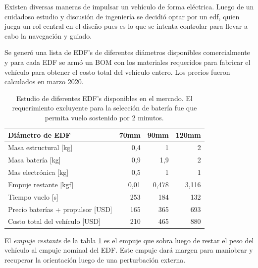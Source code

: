 Existen diversas maneras de impulsar un vehículo de forma eléctrica. Luego de un cuidadoso estudio y discusión de ingeniería se decidió optar por un \gls{edf}, quien juega un rol central en el diseño pues es lo que se intenta controlar para llevar a cabo la navegación y guiado.


\medskip

Se generó una lista de EDF's de diferentes diámetros disponibles comercialmente y para cada EDF se armó un BOM con los materiales requeridos para fabricar el vehículo para obtener el costo total del vehículo entero. Los precios fueron calculados en marzo 2020.

\begin{table}[!ht]
    \centering
    \begin{tabular}{l|r|r|r}
Diámetro de EDF    & \multicolumn{1}{l|}{70mm} & \multicolumn{1}{l|}{90mm} & \multicolumn{1}{l}{120mm} \\ \hline
    Masa estructural {[}kg{]}           & 0,4                       & 1                         & 2                          \\ \hline
    Masa batería       {[}kg{]}         & 0,9                       & 1,9                       & 2                          \\ \hline
    Mas electrónica {[}kg{]}            & 0,5                       & 1                         & 1                          \\ \hline
    Empuje restante {[}kgf{]}           & 0,01                      & 0,478                     & 3,116                      \\ \hline
    Tiempo vuelo {[}s{]}                & 253              & 184              & 132                \\ \hline
    Precio baterías + propulsor {[}USD{]} & 165                   & 365                   & 693                   \\ \hline
    Costo total del vehículo {[}USD{]}               & 210              & 465              & 880                 \\ \hline
    \end{tabular}
    \caption{Estudio de diferentes EDF's disponibles en el mercado. El requerimiento excluyente para la selección de batería fue que permita vuelo sostenido por 2 minutos.}
    \label{tab:edfseleccion}
\end{table}


El \textit{empuje restante} de la tabla \ref{tab:edfseleccion} es el empuje que sobra luego de restar el peso del vehículo al empuje nominal del EDF. Este empuje dará margen para maniobrar y recuperar la orientación luego de una perturbación externa.

